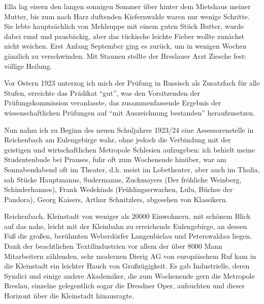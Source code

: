 \documentclass[a5paper,pagesize,10pt,twoside=true]{scrbook}
\renewcommand{\marginpar}[2][]{}
\begin{document}
Ella lag eisern den langen sonnigen Sommer über hinter dem Mietshaus meiner Mutter, bis zum nach Harz duftenden Kiefernwalde waren nur wenige Schritte. Sie lebte hauptsächlich von Mehlsuppe mit einem guten Stück Butter, wurde dabei rund und pausbäckig, aber das tückische leichte Fieber wollte zunächst nicht weichen. Erst Anfang September ging es zurück, um in wenigen Wochen gänzlich zu verschwinden. Mit Staunen stellte der Breslauer Arzt Ziesche fest: völlige Heilung.

Vor Ostern 1923 unterzog ich mich der Prüfung in Russisch als Zusatzfach für alle Stufen, erreichte das Prädikat \enquote{gut}, was den Vorsitzenden der Prüfungskommission veranlasste, das zusammenfassende Ergebnis der wissenschaftlichen Prüfungen auf \enquote{mit Auszeichnung bestanden} heraufzusetzen.

Nun nahm ich zu Beginn des neuen Schuljahres 1923/24 eine Assessorenstelle in Reichenbach am Eulengebirge wahr, ohne jedoch die Verbindung mit der geistigen und wirtschaftlichen Metropole Schlesien aufzugeben: ich behielt meine Studentenbude bei Prauses, fuhr oft zum Wochenende hinüber, war am Sonnabendabend oft im Theater, d.h. meist im Lobetheater, aber auch im Thalia, sah Stücke Hauptmanns, Sudermanns, Zuckmayers (Der fröhliche Weinberg, Schinderhannes), Frank Wedekinds (Frühlingserwachen, Lulu, Büchse der Pandora), Georg Kaisers, Arthur Schnitzlers, abgesehen von Klassikern.

Reichenbach, Kleinstadt von weniger als \num{20000} Einwohnern, mit schönem Blick auf das nahe, leicht mit der Kleinbahn zu erreichende Eulengebirge, an dessen Fuß die großen, berühmten Weberdörfer Langenbielau und Peterswaldau liegen. Dank der beachtlichen Textilindustrien vor allem der über \num{8000} Mann Mitarbeitern zählenden, sehr modernen Dierig AG von europäischem Ruf kam in die Kleinstadt ein leichter Hauch von Großzügigkeit. Es gab Industrielle, deren Syndici und einige andere Akademiker, die zum Wochenende gern die Metropole Breslau, einzelne gelegentlich sogar die Dresdner Oper, aufsuchten und dieser Horizont über die Kleinstadt hinausragte.

\marginpar{Abschrift von Heft 3 beendet am 04-08-99 in Barnave}
\end{document}
